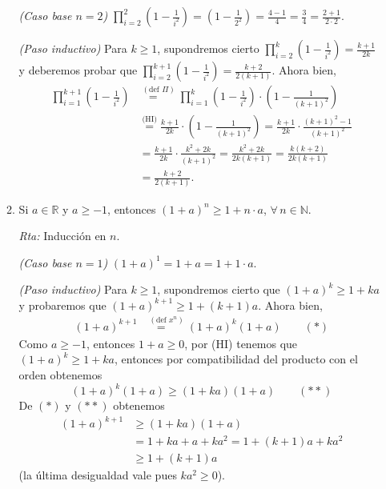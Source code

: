 \documentclass[12pt,spanish,makeidx]{amsbook}
\newcommand{\rta}{\noindent\textit{Rta: }}
\begin{document}
\begin{enumerate}
\begin{enumerate}
			\textit{(Caso base $n=2$) } $\prod_{i=2}^2 \left(1-\frac{1}{i^2}\right) = (1- \frac{1}{2^2}) = \frac{4-1}{4} = \frac{3}{4} = \frac{2+1}{2 \cdot 2}$.
			
			\textit{(Paso inductivo) } Para  $k \ge 1$,  supondremos cierto $\prod_{i=2}^k \left(1-\frac{1}{i^2}\right) = \frac{k+1}{2k}$ y  deberemos probar  que $\prod_{i=2}^{k+1} \left(1-\frac{1}{i^2}\right) = \frac{k+2}{2(k+1)}$. Ahora bien,
			\begin{align*}
			\prod_{i=1}^{k+1}\left(1-\frac{1}{i^2}\right) &\overset{(\text{def } \Pi)}{=\quad} \prod_{i=1}^k \left(1-\frac{1}{i^2}\right) \cdot \left(1-\frac{1}{(k+1)^2}\right)\\ &\overset{\text{(HI)}}{=}  \frac{k+1}{2k} \cdot\left(1-\frac{1}{(k+1)^2}\right)
			=  \frac{k+1}{2k} \cdot\frac{(k+1)^2- 1}{(k+1)^2} \\
			&= \frac{k+1}{2k} \cdot\frac{k^2+2k}{(k+1)^2} = \frac{k^2+2k}{2k (k+1)} = \frac{k(k+2)}{2k (k+1)} \\
			&=  \frac{k+2}{2 (k+1)}.
			\end{align*}
			
			\item Si $a\in \mathbb R$ y $a\geq -1$, entonces $(1+a)^n\geq 1+n\cdot a$, $\forall \, n \in \mathbb N$.
			
			\rta Inducción en $n$.
			
			\textit{(Caso base $n=1$) } $(1+a)^1 = 1+a = 1+ 1\cdot a$. 
			
			\textit{(Paso inductivo) }  Para  $k \ge 1$,  supondremos cierto que $(1+a)^k\geq 1+k a$ y probaremos  que $(1+a)^{k+1}\geq 1+(k+1) a$. Ahora bien, 
			\begin{align*}
			(1+a)^{k+1} &\overset{(\text{def } x^n)}{=\quad} (1+a)^k(1+a) \qquad (*)
			\end{align*}
			Como $a\ge -1$, entonces $1+a \ge 0$, por (HI) tenemos  que $(1+a)^k\geq 1+k a$, entonces  por compatibilidad del  producto con el orden obtenemos
			\begin{equation*}
				(1+a)^k(1+a) \ge   (1+k a)(1+a)  \qquad (**)
			\end{equation*}
			De $(*)$ y $(**)$ obtenemos
			\begin{align*}
			(1+a)^{k+1} &\ge (1+k a)(1+a) \\
			&= 1+ ka + a + ka^2 = 1 + (k+1)a + ka^2 \\
			&\ge 1 + (k+1)a
			\end{align*}
			(la última desigualdad vale pues $ka^2 \ge 0$). 
			

\end{enumerate}
\end{enumerate}
\end{document}

